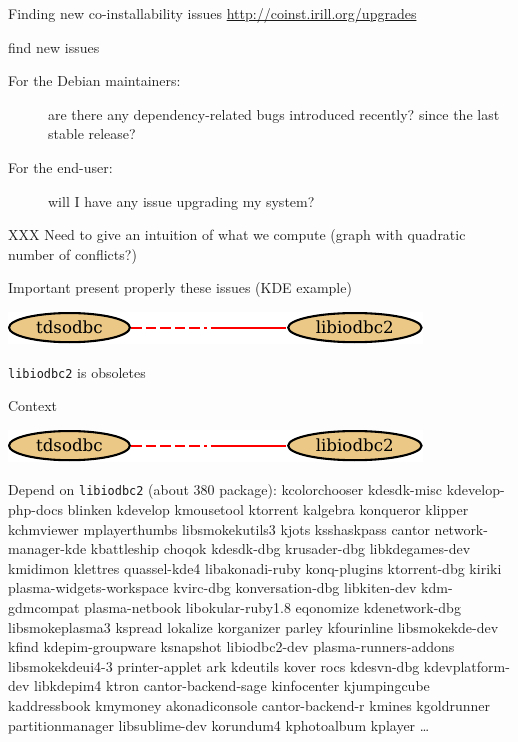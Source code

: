 \documentclass[xcolor={dvipsnames}]{beamer}
\begin{document}
\begin{frame}{Finding new co-installability issues}
\url{http://coinst.irill.org/upgrades}

find new issues

\begin{description}
\item[For the Debian maintainers:]
are there any dependency-related bugs introduced recently? since the
last stable release?
\item[For the end-user:] will I have any issue upgrading my system?
\end{description}

XXX Need to give an intuition of what we compute
(graph with quadratic number of conflicts?)

Important present properly these issues (KDE example)

\begin{center}
\includegraphics{figures/libiodbc2}
\end{center}

\texttt{libiodbc2} is obsoletes

\end{frame}

\begin{frame}{Context}
\begin{center}
\includegraphics{figures/libiodbc2}
\end{center}
Depend on \texttt{libiodbc2} (about 380 package):
kcolorchooser kdesdk-misc kdevelop-php-docs blinken kdevelop
kmousetool ktorrent kalgebra konqueror klipper kchmviewer
mplayerthumbs libsmokekutils3 kjots ksshaskpass cantor
network-manager-kde kbattleship choqok kdesdk-dbg krusader-dbg
libkdegames-dev kmidimon klettres quassel-kde4 libakonadi-ruby
konq-plugins ktorrent-dbg kiriki plasma-widgets-workspace kvirc-dbg
konversation-dbg libkiten-dev kdm-gdmcompat plasma-netbook
libokular-ruby1.8 eqonomize kdenetwork-dbg libsmokeplasma3 kspread
lokalize korganizer parley kfourinline libsmokekde-dev kfind
kdepim-groupware ksnapshot libiodbc2-dev plasma-runners-addons
libsmokekdeui4-3 printer-applet ark kdeutils kover rocs kdesvn-dbg
kdevplatform-dev libkdepim4 ktron cantor-backend-sage kinfocenter
kjumpingcube kaddressbook kmymoney akonadiconsole cantor-backend-r
kmines kgoldrunner partitionmanager libsublime-dev korundum4
kphotoalbum kplayer
\ldots

\end{frame}
\end{document}
